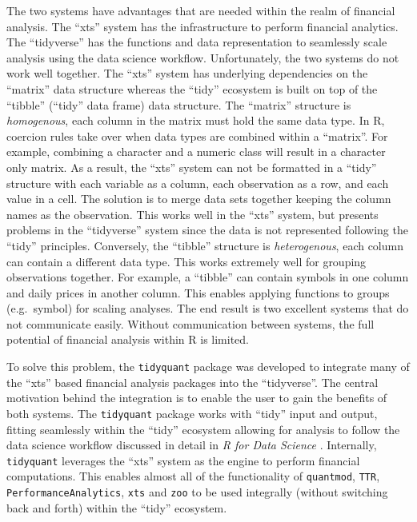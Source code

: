 The two systems have advantages that are needed within the realm of
financial analysis. The ``xts'' system has the infrastructure to perform
financial analytics. The ``tidyverse'' has the functions and data
representation to seamlessly scale analysis using the data science
workflow. Unfortunately, the two systems do not work well together. The
``xts'' system has underlying dependencies on the ``matrix'' data
structure whereas the ``tidy'' ecosystem is built on top of the
``tibble'' (``tidy'' data frame) data structure. The ``matrix''
structure is \emph{homogenous}, each column in the matrix must hold the
same data type. In R, coercion rules take over when data types are
combined within a ``matrix''. For example, combining a character and a
numeric class will result in a character only matrix. As a result, the
``xts'' system can not be formatted in a ``tidy'' structure with each
variable as a column, each observation as a row, and each value in a
cell. The solution is to merge data sets together keeping the column
names as the observation. This works well in the ``xts'' system, but
presents problems in the ``tidyverse'' system since the data is not
represented following the ``tidy'' principles. Conversely, the
``tibble'' structure is \emph{heterogenous}, each column can contain a
different data type. This works extremely well for grouping observations
together. For example, a ``tibble'' can contain symbols in one column
and daily prices in another column. This enables applying functions to
groups (e.g.~symbol) for scaling analyses. The end result is two
excellent systems that do not communicate easily. Without communication
between systems, the full potential of financial analysis within R is
limited.

To solve this problem, the \texttt{tidyquant} package was developed to
integrate many of the ``xts'' based financial analysis packages into the
``tidyverse''. The central motivation behind the integration is to
enable the user to gain the benefits of both systems. The
\texttt{tidyquant} package works with ``tidy'' input and output, fitting
seamlessly within the ``tidy'' ecosystem allowing for analysis to follow
the data science workflow discussed in detail in \emph{R for Data
Science} \citep{R4DS2017}. Internally, \texttt{tidyquant} leverages the
``xts'' system as the engine to perform financial computations. This
enables almost all of the functionality of \texttt{quantmod},
\texttt{TTR}, \texttt{PerformanceAnalytics}, \texttt{xts} and
\texttt{zoo} to be used integrally (without switching back and forth)
within the ``tidy'' ecosystem.

